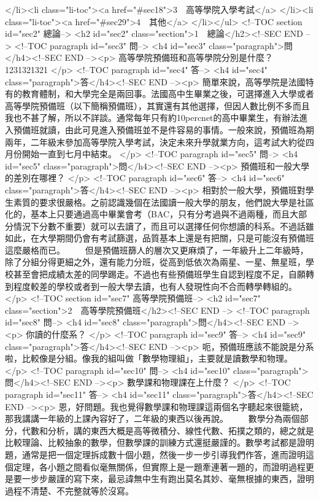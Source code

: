 {{{{</li><li class="li-toc"><a href="#sec18">3  高等學院入學考試</a>
</li><li class="li-toc"><a href="#sec29">4  其他</a>
</li></ul>
<!--TOC section id="sec2" 總論-->
<h2 id="sec2" class="section">1  總論</h2><!--SEC END -->
<!--TOC paragraph id="sec3" 問-->
<h4 id="sec3" class="paragraph">問</h4><!--SEC END --><p>
高等學院預備班和高等學院分別是什麼？1231321321
</p>
<!--TOC paragraph id="sec4" 答-->
<h4 id="sec4" class="paragraph">答</h4><!--SEC END --><p>
簡單來說，高等學院是法國特有的教育體制，和大學完全是兩回事。法國高中生畢業之後，可選擇進入大學或者高等學院預備班（以下簡稱預備班），其實還有其他選擇，但因人數比例不多而且我也不甚了解，所以不詳談。通常每年只有約10percnet的高中畢業生，有辦法進入預備班就讀，由此可見進入預備班並不是件容易的事情。一般來說，預備班為期兩年，二年級末參加高等學院入學考試，決定未來升學就業方向，這考試大約從四月份開始一直到七月中結束。
</p>
<!--TOC paragraph id="sec5" 問-->
<h4 id="sec5" class="paragraph">問</h4><!--SEC END --><p>
預備班和一般大學的差別在哪裡？
</p>
<!--TOC paragraph id="sec6" 答-->
<h4 id="sec6" class="paragraph">答</h4><!--SEC END --><p>
相對於一般大學，預備班對學生素質的要求很嚴格。之前認識幾個在法國讀一般大學的朋友，他們說大學是社區化的，基本上只要通過高中畢業會考（BAC，只有分考過與不過兩種，而且大部分情況下分數不重要）就可以去讀了，而且可以選擇任何你想讀的科系。不過話雖如此，在大學期間仍會有考試篩選，品質基本上還是有把關，只是可能沒有預備班這麼嚴格而已。
　　但是預備班篩人的層次又更麻煩了，一年級升上二年級時，除了分組分得更細之外，還有能力分班，從高到低依次為兩星、一星、無星班，學校甚至會把成績太差的同學踢走。不過也有些預備班學生自認到程度不足，自願轉到程度較差的學校或者到一般大學去讀，也有人發現性向不合而轉學轉組的。</p>
<!--TOC section id="sec7" 高等學院預備班-->
<h2 id="sec7" class="section">2  高等學院預備班</h2><!--SEC END -->
<!--TOC paragraph id="sec8" 問-->
<h4 id="sec8" class="paragraph">問</h4><!--SEC END --><p>
你讀的什麼系？
</p>
<!--TOC paragraph id="sec9" 答-->
<h4 id="sec9" class="paragraph">答</h4><!--SEC END --><p>
呃，預備班應該不能說是分系啦，比較像是分組。像我的組叫做「數學物理組」，主要就是讀數學和物理。
</p>
<!--TOC paragraph id="sec10" 問-->
<h4 id="sec10" class="paragraph">問</h4><!--SEC END --><p>
數學課和物理課在上什麼？
</p>
<!--TOC paragraph id="sec11" 答-->
<h4 id="sec11" class="paragraph">答</h4><!--SEC END --><p>
恩，好問題。我也覺得數學課和物理課這兩個名字聽起來很籠統，那我講講一年級的上課內容好了，二年級的東西以後再說。
　　數學分為兩個部分，代數和分析，講的東西大概是高等微積分、線性代數、拓撲之類的，總之就是比較理論、比較抽象的數學，但數學課的訓練方式還挺嚴謹的。數學考試都是證明題，通常是把一個定理拆成數十個小題，然後一步一步引導我們作答，進而證明這個定理，各小題之間看似毫無關係，但實際上是一題牽連著一題的，而證明過程更是要一步步嚴謹的寫下來，最忌諱無中生有跑出莫名其妙、毫無根據的東西，證明過程不清楚、不完整就等於沒寫。
}}}}
